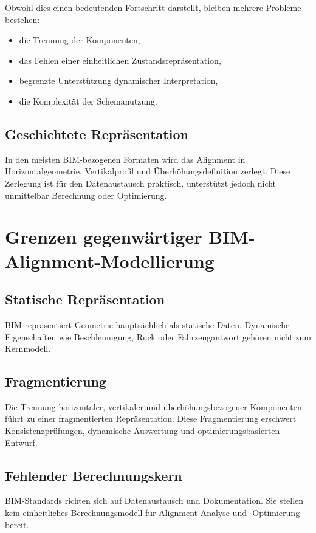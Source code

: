 Obwohl dies einen bedeutenden Fortschritt darstellt, bleiben mehrere
Probleme bestehen:
\begin{itemize}
\item die Trennung der Komponenten,
\item das Fehlen einer einheitlichen Zustandsrepräsentation,
\item begrenzte Unterstützung dynamischer Interpretation,
\item die Komplexität der Schemanutzung.
\end{itemize}

\subsection{Geschichtete Repräsentation}

In den meisten BIM-bezogenen Formaten wird das Alignment in
Horizontalgeometrie, Vertikalprofil und Überhöhungsdefinition zerlegt.
Diese Zerlegung ist für den Datenaustausch praktisch, unterstützt jedoch
nicht unmittelbar Berechnung oder Optimierung.

\section{Grenzen gegenwärtiger BIM-Alignment-Modellierung}

\subsection{Statische Repräsentation}

BIM repräsentiert Geometrie hauptsächlich als statische Daten. Dynamische
Eigenschaften wie Beschleunigung, Ruck oder Fahrzeugantwort gehören nicht
zum Kernmodell.

\subsection{Fragmentierung}

Die Trennung horizontaler, vertikaler und überhöhungsbezogener Komponenten
führt zu einer fragmentierten Repräsentation. Diese Fragmentierung
erschwert Konsistenzprüfungen, dynamische Auswertung und
optimierungsbasierten Entwurf.

\subsection{Fehlender Berechnungskern}

BIM-Standards richten sich auf Datenaustausch und Dokumentation. Sie
stellen kein einheitliches Berechnungsmodell für Alignment-Analyse und
-Optimierung bereit.

